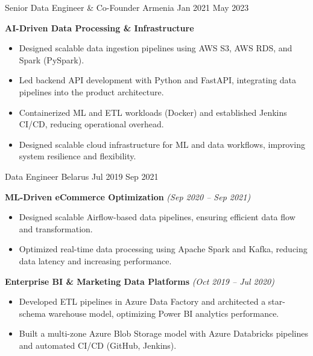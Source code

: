           {Senior Data Engineer \& Co-Founder}
          {Armenia}
          {Jan 2021}
          {May 2023}

\smallskip

\textbf{AI-Driven Data Processing \& Infrastructure}
\cvexpspace
\begin{itemize}
  \cvitemsep
  \item Designed scalable data ingestion pipelines using AWS S3, AWS RDS, and Spark (PySpark).
  \item Led backend API development with Python and FastAPI, integrating data pipelines into the product architecture.
  \item Containerized ML and ETL workloads (Docker) and established Jenkins CI/CD, reducing operational overhead.
  \item Designed scalable cloud infrastructure for ML and data workflows, improving system resilience and flexibility.
\end{itemize}

          {Data Engineer}
          {Belarus}
          {Jul 2019}
          {Sep 2021}

\smallskip

\textbf{ML-Driven eCommerce Optimization} \textit{(Sep 2020 -- Sep 2021)}
\cvexpspace
\begin{itemize}
  \cvitemsep
  \item Designed scalable Airflow-based data pipelines, ensuring efficient data flow and transformation.
  \item Optimized real-time data processing using Apache Spark and Kafka, reducing data latency and increasing performance.
\end{itemize}

\textbf{Enterprise BI \& Marketing Data Platforms} \textit{(Oct 2019 -- Jul 2020)}
\cvexpspace
\begin{itemize}
  \cvitemsep
  \item Developed ETL pipelines in Azure Data Factory and architected a star-schema warehouse model, optimizing Power BI analytics performance.
  \item Built a multi-zone Azure Blob Storage model with Azure Databricks pipelines and automated CI/CD (GitHub, Jenkins).
\end{itemize}
